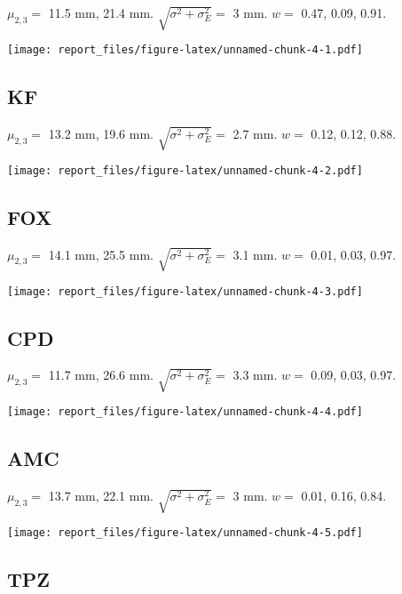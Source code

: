 \documentclass[]{article}
\begin{document}
\(\mu_{2,3}=\) 11.5 mm, 21.4 mm. \(\sqrt{\sigma^2+\sigma_E^2}=\) 3 mm.
\(w=\) 0.47, 0.09, 0.91.

\texttt{[image: report\_files/figure-latex/unnamed-chunk-4-1.pdf]}

\pagebreak

\subsection{KF}\label{kf}

\(\mu_{2,3}=\) 13.2 mm, 19.6 mm. \(\sqrt{\sigma^2+\sigma_E^2}=\) 2.7 mm.
\(w=\) 0.12, 0.12, 0.88.

\texttt{[image: report\_files/figure-latex/unnamed-chunk-4-2.pdf]}

\pagebreak

\subsection{FOX}\label{fox}

\(\mu_{2,3}=\) 14.1 mm, 25.5 mm. \(\sqrt{\sigma^2+\sigma_E^2}=\) 3.1 mm.
\(w=\) 0.01, 0.03, 0.97.

\texttt{[image: report\_files/figure-latex/unnamed-chunk-4-3.pdf]}

\pagebreak

\subsection{CPD}\label{cpd}

\(\mu_{2,3}=\) 11.7 mm, 26.6 mm. \(\sqrt{\sigma^2+\sigma_E^2}=\) 3.3 mm.
\(w=\) 0.09, 0.03, 0.97.

\texttt{[image: report\_files/figure-latex/unnamed-chunk-4-4.pdf]}

\pagebreak

\subsection{AMC}\label{amc}

\(\mu_{2,3}=\) 13.7 mm, 22.1 mm. \(\sqrt{\sigma^2+\sigma_E^2}=\) 3 mm.
\(w=\) 0.01, 0.16, 0.84.

\texttt{[image: report\_files/figure-latex/unnamed-chunk-4-5.pdf]}

\pagebreak

\subsection{TPZ}\label{tpz}
\end{document}
